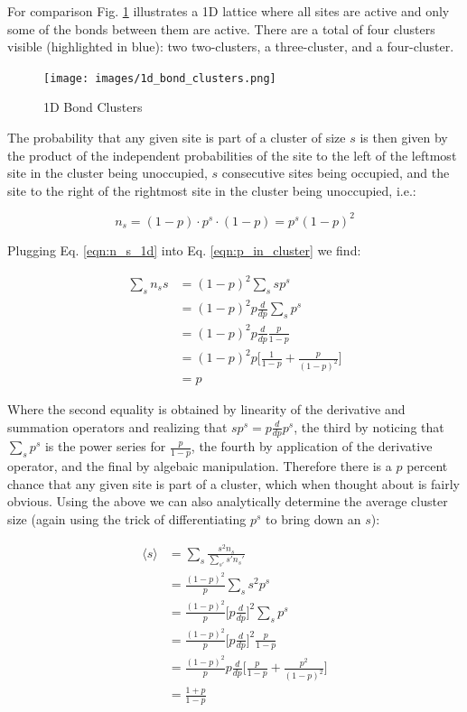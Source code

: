 For comparison Fig. \ref{fig:1d_bond_clusters} illustrates a 1D lattice where all sites are active and only some of the bonds between them are active.
There are a total of four clusters visible (highlighted in blue): two two-clusters, a three-cluster, and a four-cluster.

\begin{figure}[H]
	\centering
	\texttt{[image: images/1d\_bond\_clusters.png]}
	\caption{1D Bond Clusters}
	\label{fig:1d_bond_clusters}
\end{figure}

The probability that any given site is part of a cluster of size $s$ is then given by the product of the independent probabilities of the site to the left of the leftmost site in the cluster being unoccupied, $s$ consecutive sites being occupied, and the site to the right of the rightmost site in the cluster being unoccupied, i.e.:

\begin{equation}
	\label{eqn:n_s_1d}
	n_s = (1 - p) \cdot p^s \cdot (1 - p) = p^s (1 - p)^2
\end{equation}

Plugging Eq. \ref{eqn:n_s_1d} into Eq. \ref{eqn:p_in_cluster} we find:

\begin{equation}
\begin{split}
	\sum_s n_s s &= (1 - p)^2 \sum_s s p^s\\
	&= (1 - p)^2 p \frac{d}{dp} \sum_s p^s\\
	&= (1 - p)^2 p \frac{d}{dp} \frac{p}{1-p}\\
	&= (1 - p)^2 p \bigg[ \frac{1}{1-p} + \frac{p}{(1 - p)^2} \bigg]\\
	&= p
\end{split}
\end{equation}

Where the second equality is obtained by linearity of the derivative and summation operators and realizing that $s p^s = p \frac{d}{dp} p^s$, the third by noticing that $\sum_s p^s$ is the power series for $\frac{p}{1-p}$, the fourth by application of the derivative operator, and the final by algebaic manipulation.
Therefore there is a $p$ percent chance that any given site is part of a cluster, which when thought about is fairly obvious.
Using the above we can also analytically determine the average cluster size (again using the trick of differentiating $p^s$ to bring down an $s$):

\begin{equation}
\begin{split}
	\langle s \rangle &= \sum_s \frac{s^2 n_s}{\sum_{s'} s' n_s'}\\
	&= \frac{(1 - p)^2}{p} \sum_s s^2 p^s\\
	&= \frac{(1 - p)^2}{p} \bigg[p\frac{d}{dp}\bigg]^2 \sum_s p^s\\
	&= \frac{(1 - p)^2}{p} \bigg[p\frac{d}{dp}\bigg]^2 \frac{p}{1 - p}\\
	&= \frac{(1 - p)^2}{p} p \frac{d}{dp} \bigg[ \frac{p}{1-p} + \frac{p^2}{(1 - p)^2} \bigg]\\
	&= \frac{1 + p}{1 - p}
\end{split}
\end{equation}

